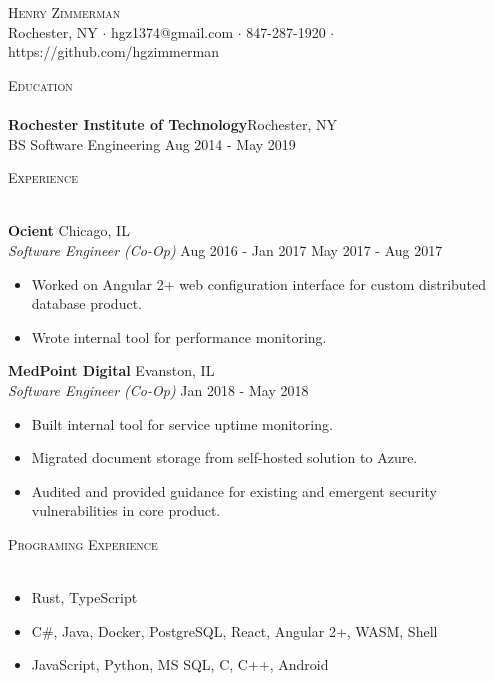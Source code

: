 \documentclass[a4paper]{article}
\newcommand{\lineunder} {
    \vspace*{-8pt} \\
    \hspace*{-18pt} \hrulefill \\
}
\newcommand{\header} [1] {
    {\hspace*{-18pt}\vspace*{6pt} \textsc{#1}}
    \vspace*{-6pt} \lineunder
}
\begin{document}
\vspace*{-40pt}

    

\vspace*{-10pt}
\begin{center}
	{\Huge \scshape {Henry Zimmerman}}\\
	Rochester, NY $\cdot$ hgz1374@gmail.com $\cdot$ 847-287-1920 $\cdot$ https://github.com/hgzimmerman\\
\end{center}

\header{Education}
\textbf{Rochester Institute of Technology}\hfill Rochester, NY\\
BS Software Engineering \hfill Aug 2014 - May 2019\\
\vspace{2mm}

\header{Experience}
\vspace{1mm}

\textbf{Ocient} \hfill Chicago, IL\\
\textit{Software Engineer (Co-Op)} \hfill Aug 2016 - Jan 2017 \textbar{} May 2017 - Aug 2017\\
\vspace{-1mm}
\begin{itemize} \itemsep 1pt
	\item Worked on Angular 2+ web configuration interface for custom distributed database product.
	\item Wrote internal tool for performance monitoring.
\end{itemize}
\textbf{MedPoint Digital} \hfill Evanston, IL\\
\textit{Software Engineer (Co-Op)} \hfill Jan 2018 - May 2018\\
\vspace{-1mm}
\begin{itemize} \itemsep 1pt
	\item Built internal tool for service uptime monitoring.
	\item Migrated document storage from self-hosted solution to Azure.
	\item Audited and provided guidance for existing and emergent security vulnerabilities in core product.
\end{itemize}

\header{Programing Experience}
\begin{itemize}[leftmargin=*]\itemsep 1pt 
    \item[]{ Rust, TypeScript}
    \item[]{ C\#, Java,  Docker, PostgreSQL, React, Angular 2+, WASM, Shell}
    \item[]{ JavaScript, Python, MS SQL, C, C++, Android}
\end{itemize}
\vspace{2mm}
\end{document}
